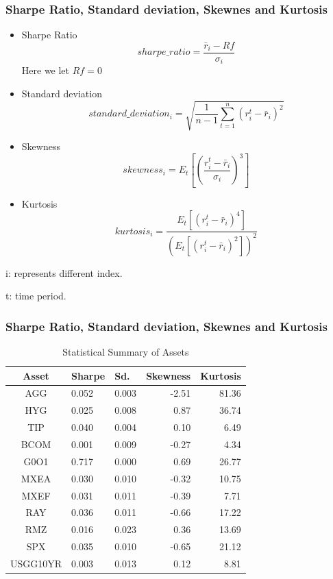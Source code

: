 \documentclass{beamer}
\newcommand\Fontviii{\fontsize{8}{9.2}\selectfont}
\begin{document}
\begin{frame}
\frametitle{Sharpe Ratio, Standard deviation, Skewnes and Kurtosis}
\Fontviii
\begin{itemize}
\item Sharpe Ratio
\begin{equation}
sharpe\_ratio = \frac{\bar{r}_i-Rf}{\sigma_i}
\end{equation}
Here we let $Rf = 0$
\item Standard deviation
\begin{equation}
standard\_deviation_i =\sqrt{ \frac{1}{n-1}\sum_{t=1}^n{(r_i^t-\bar{r}_i)^2}} 
\end{equation}
\item Skewness
\begin{equation}
skewness_i = E_t \left[ \left( \frac{r_i^t-\bar{r}_i}{\sigma_i} \right)^3 \right]
\end{equation}
\item Kurtosis
\begin{equation}
kurtosis_i = \frac{E_t \left[ \left( r_i^t-\bar{r}_i \right)^4 \right]}{\left(E_t \left[ \left( r_i^t-\bar{r}_i \right)^2 \right]\right)^2}
\end{equation}
\end{itemize}

i: represents different index.

t: time period.
\end{frame}


\begin{frame}
\frametitle{Sharpe Ratio, Standard deviation, Skewnes and Kurtosis}
\Fontviii
\begin{table}[!h]
\caption{Statistical Summary of Assets} %
\centering 
\begin{tabular}{ | c || p{1.5cm} p{1.2cm} r r | } 
 \hline
Asset & Sharpe  & Sd. & Skewness & Kurtosis \\
  \hline \hline
AGG & 0.052 & 0.003 & -2.51 & 81.36\\ 
HYG & 0.025 & 0.008 &  0.87 & 36.74\\ 
TIP & 0.040 & 0.004 &  0.10 &  6.49\\ 
BCOM & 0.001 & 0.009 & -0.27 &  4.34\\ 
G0O1 & 0.717 & 0.000 &  0.69 & 26.77\\ 
MXEA & 0.030 & 0.010 & -0.32 & 10.75\\ 
MXEF & 0.031 & 0.011 & -0.39 &  7.71\\ 
RAY & 0.036 & 0.011 & -0.66 & 17.22\\ 
RMZ & 0.016 & 0.023 &  0.36 & 13.69\\ 
SPX & 0.035 & 0.010 & -0.65 & 21.12\\ 
USGG10YR & 0.003 & 0.013 &  0.12 &  8.81\\
 \hline
\end{tabular}
\label{table:statSum}
\end{table}
\end{frame}
\end{document}
